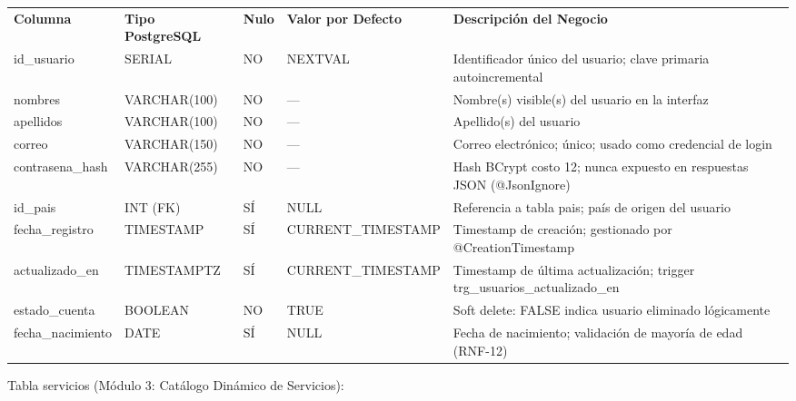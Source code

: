 \documentclass[
]{article}
\begin{document}
\begin{longtable}[]{@{}
  >{\raggedright\arraybackslash}p{}
  >{\raggedright\arraybackslash}p{}
  >{\raggedright\arraybackslash}p{}
  >{\raggedright\arraybackslash}p{}
  >{\raggedright\arraybackslash}p{}@{}}
\toprule\noalign{}
\endhead
\bottomrule\noalign{}
\endlastfoot
\textbf{Columna} & \textbf{Tipo PostgreSQL} & \textbf{Nulo} &
\textbf{Valor por Defecto} & \textbf{Descripción del Negocio} \\
id\_usuario & SERIAL & NO & NEXTVAL & Identificador único del usuario;
clave primaria autoincremental \\
nombres & VARCHAR(100) & NO & --- & Nombre(s) visible(s) del usuario en
la interfaz \\
apellidos & VARCHAR(100) & NO & --- & Apellido(s) del usuario \\
correo & VARCHAR(150) & NO & --- & Correo electrónico; único; usado como
credencial de login \\
contrasena\_hash & VARCHAR(255) & NO & --- & Hash BCrypt costo 12; nunca
expuesto en respuestas JSON (@JsonIgnore) \\
id\_pais & INT (FK) & SÍ & NULL & Referencia a tabla pais; país de
origen del usuario \\
fecha\_registro & TIMESTAMP & SÍ & CURRENT\_TIMESTAMP & Timestamp de
creación; gestionado por @CreationTimestamp \\
actualizado\_en & TIMESTAMPTZ & SÍ & CURRENT\_TIMESTAMP & Timestamp de
última actualización; trigger trg\_usuarios\_actualizado\_en \\
estado\_cuenta & BOOLEAN & NO & TRUE & Soft delete: FALSE indica usuario
eliminado lógicamente \\
fecha\_nacimiento & DATE & SÍ & NULL & Fecha de nacimiento; validación
de mayoría de edad (RNF-12) \\
\end{longtable}

Tabla servicios (Módulo 3: Catálogo Dinámico de Servicios):
\end{document}
